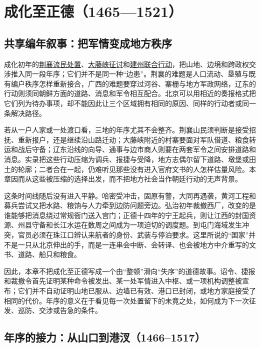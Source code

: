 \chapter{成化至正德（1465—1521）}
\label{ch:chenghua-zhengde}

\section{共享编年叙事：把军情变成地方秩序}

成化初年的\hyperlink{evt:MM-1465-JINGXIANG-UPRISING}{荆襄流民处置}、\hyperlink{evt:MM-1465-DATENG-GORGE-CAMPAIGN}{大藤峡征讨}和\hyperlink{evt:MM-1467-JIANZHOU-CAMPAIGN}{建州联合行动}，把山地、边境和跨政权交涉推入同一段年序；它们并不是同一种“边患”。荆襄的难题是人口流动、垦殖与既有编户秩序怎样重新接合，广西的难题要穿过河谷、寨栅与地方军政网络，辽东的行动则须同朝鲜方面的道路、消息和军令相互配合。北京可以用相近的奏报格式把它们列为待办事项，却不能因此让三个区域拥有相同的原因、同样的行动者或同一条解决路径。

若从一户人家或一处渡口看，三地的年序尤其不会整齐。荆襄山民须判断是接受招抚、重新报户，还是继续沿山路迁动；大藤峡附近的村寨要面对军队借道、粮食转运和战后守备；辽东沿线的向导、通事与边市商人则要在两套军令之间安排道路和消息。实录把这些行动压缩为调兵、报捷与受降，地方志偶尔留下道路、墩堡或田土的轮廓；二者合在一起，仍难听见那些没有进入官府文书的人怎样估量风险。本章因而从这些被压缩的选择出发，而不把地方社会当作朝廷行动的无声背景。

这条时间线随后没有进入平静。哈密受冲击，固原有警，大同再遇袭，黄河工程和募兵尝试又把水路、粮饷与人力牵到边防问题旁边。弘治初年裁撤西厂，改变的是谁能够把消息绕过常规衙门送入宫门；正德十四年的宁王起兵，则让江西的封国资源、州县守备和长江水运在数周之间成为一项迫切的调度题。到屯门海域发生冲突，官员必须在珠江口辨认来航者的身份、武装与停泊要求。这里所说的“国家”并不是一只从北京伸出的手，而是一连串会中断、会转译、也会被地方中介重写的文书、道路、船只和粮食。

因此，本章不把成化至正德写成一个由“整顿”滑向“失序”的道德故事。诏令、捷报和裁撤令首先证明某种命令被发出、某一处军情进入中枢、或一项机构调整被宣布；它们并不自动证明山地已服从、边墙已有效、港口已封闭，或地方家庭接受了相同的代价。年序的意义在于看见每一次处置留下的未竟之处，如何成为下一次征发、巡防、交涉或告急的条件。

\section{年序的接力：从山口到港汊（1466--1517）}

